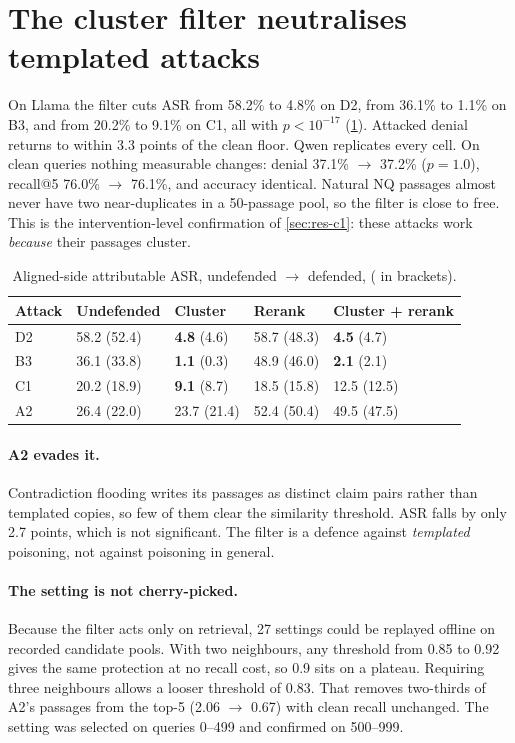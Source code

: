 \section{The cluster filter neutralises templated attacks}
\label{sec:def-cluster}

On Llama the filter cuts ASR from 58.2\% to 4.8\% on D2, from 36.1\% to 1.1\% on
B3, and from 20.2\% to 9.1\% on C1, all with $p < 10^{-17}$
(\cref{tab:defence}). Attacked denial returns to within 3.3 points of the clean
floor. Qwen replicates every cell. On clean queries nothing measurable
changes: denial 37.1\% $\to$ 37.2\% ($p=1.0$), recall@5 76.0\% $\to$ 76.1\%,
and accuracy identical. Natural NQ passages almost never have two
near-duplicates in a 50-passage pool, so the filter is close to free. This is
the intervention-level confirmation of \cref{sec:res-c1}: these attacks work
\emph{because} their passages cluster.

\begin{table}[ht]
\centering
\small
\caption[Defence ASR]{Aligned-side attributable ASR, undefended $\to$ defended,
 ( in brackets).}
\label{tab:defence}
\begin{tabular}{@{}lllll@{}}
\toprule
Attack & Undefended & Cluster & Rerank & Cluster + rerank \\
\midrule
D2 & 58.2 (52.4) & \textbf{4.8} (4.6)  & 58.7 (48.3) & \textbf{4.5} (4.7) \\
B3 & 36.1 (33.8) & \textbf{1.1} (0.3)  & 48.9 (46.0) & \textbf{2.1} (2.1) \\
C1 & 20.2 (18.9) & \textbf{9.1} (8.7)  & 18.5 (15.8) & 12.5 (12.5) \\
A2 & 26.4 (22.0) & 23.7 (21.4)          & 52.4 (50.4) & 49.5 (47.5) \\
\bottomrule
\end{tabular}
\end{table}

\paragraph{A2 evades it.} Contradiction flooding writes its passages as distinct
claim pairs rather than templated copies, so few of them clear the similarity
threshold. ASR falls by only 2.7 points, which is not significant. The filter is
a defence against \emph{templated} poisoning, not against poisoning in
general.

\paragraph{The setting is not cherry-picked.} Because the filter acts only on
retrieval, 27 settings could be replayed offline on recorded candidate pools.
With two neighbours, any threshold from 0.85 to 0.92 gives the same protection
at no recall cost, so 0.9 sits on a plateau. Requiring three neighbours allows
a looser threshold of 0.83. That removes two-thirds of A2's passages from the
top-5 (2.06 $\to$ 0.67) with clean recall unchanged. The setting was selected
on queries 0--499 and confirmed on 500--999.

